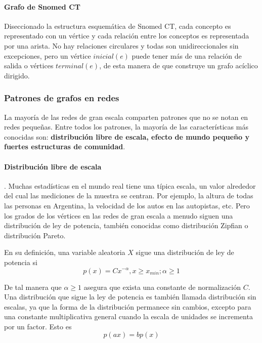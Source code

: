 \paragraph{Grafo de Snomed CT}
Diseccionado la estructura esquemática de Snomed CT, cada concepto es representado con un vértice y cada relación entre los conceptos es representada por una arista. No hay relaciones circulares y todas son unidireccionales sin excepciones, pero un vértice $inicial(e)$ puede tener más de una relación de salida o vértices $terminal(e)$, de esta manera de que construye un grafo acíclico dirigido. \cite{Bhattacharyya2016}

\subsubsection{Patrones de grafos en redes}
La mayoría de las redes de gran escala comparten patrones que no se notan en redes pequeñas. Entre todos los patrones, la mayoría de las características más conocidas son: \textbf{distribución libre de escala, efecto de mundo pequeño y fuertes estructuras de comunidad}.\cite{Tang2010}

\paragraph{Distribución libre de escala} \cite{Tang2010}.
Muchas estadísticas en el mundo real tiene una típica escala, un valor alrededor del cual las mediciones de la muestra se centran. Por ejemplo, la altura de todas las personas en Argentina, la velocidad de los autos en las autopistas, etc. Pero los grados de los vértices en las redes de gran escala a menudo siguen una distribución de ley de potencia, también conocidas como distribución Zipfian o distribución Pareto. 

En su definición, una variable aleatoria $X$ sigue una distribución de ley de potencia si
\begin{equation}
p(x)=Cx^{-\alpha}, x\geq  x_{min}; \alpha \geq 1
\end{equation}

De tal manera que $\alpha \geq 1$ asegura que exista una constante de normalización $C$. Una distribución que sigue la ley de potencia es también llamada distribución sin escalas, ya que la forma de la distribución permanece sin cambios, excepto para una constante multiplicativa general cuando la escala de unidades se incrementa por un factor. Esto es
\begin{equation}
p(ax)=bp(x)
\end{equation}
 
